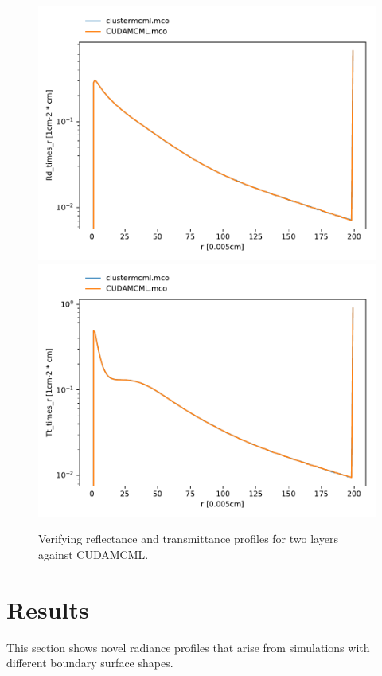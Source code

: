 \documentclass[]{article}
\begin{document}
\begin{figure}[ht!]
	\includegraphics[width=\linewidth]{img/verification5.pdf}
	\includegraphics[width=\linewidth]{img/verification6.pdf}
	\caption{Verifying reflectance and transmittance profiles for two layers against CUDAMCML.}
	\label{verification5}
\end{figure}

\section{Results}

This section shows novel radiance profiles that arise from simulations with different boundary surface shapes.
\end{document}
